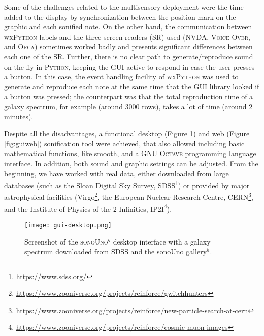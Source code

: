\documentclass[baaa]{baaa}
\begin{document}
Some of the challenges related to the multisensory deployment were the time added to the display by synchronization between the position mark on the graphic and each sonified note. On the other hand, the communication between \textsc{wxPython} labels and the three screen readers (SR) used (\textsc{NVDA}, \textsc{Voice Over}, and \textsc{Orca}) sometimes worked badly and presents significant differences between each one of the SR. Further, there is no clear path to generate/reproduce sound on the fly in \textsc{Python}, keeping the GUI active to respond in case the user presses a button. In this case, the event handling facility of \textsc{wxPython} was used to generate and reproduce each note at the same time that the GUI library looked if a button was pressed; the counterpart was that the total reproduction time of a galaxy spectrum, for example (around 3000 rows), takes a lot of time (around 2 minutes).

Despite all the disadvantages, a functional desktop (Figure \ref{fig:guidesk}) and web (Figure \ref{fig:guiweb}) sonification tool were achieved, that also allowed including basic mathematical functions, like smooth, and a \textsc{GNU Octave} programming language interface. In addition, both sound and graphic settings can be adjusted. From the beginning, we have worked with real data, either downloaded from large databases (such as the Sloan Digital Sky Survey, SDSS\footnote[3]{\url{https://www.sdss.org/}}) or provided by major astrophysical facilities (Virgo\footnote[4]{\url{https://www.zooniverse.org/projects/reinforce/gwitchhunters}}, the European Nuclear Research Centre, CERN\footnote[5]{\url{https://www.zooniverse.org/projects/reinforce/new-particle-search-at-cern}}, and the Institute of Physics of the 2 Infinities, IP2I\footnote[6]{\url{https://www.zooniverse.org/projects/reinforce/cosmic-muon-images}}).


\begin{figure}[!t]
\centering
    \texttt{[image: gui-desktop.png]}
    \caption{Screenshot of the \textsc{sonoUno}$^{g}$ desktop interface with a galaxy spectrum downloaded from SDSS and the sonoUno gallery$^{h}$.}
    \label{fig:guidesk}
\end{figure}


\end{document}
